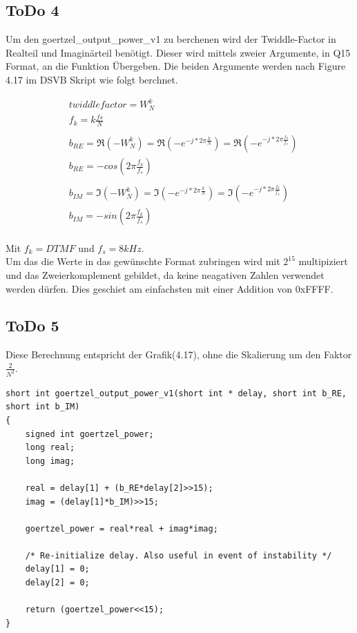 \documentclass[a4paper,11pt]{article}
\begin{document}
\subsection{ToDo 4}
Um den goertzel\_output\_power\_v1 zu berchenen wird der Twiddle-Factor in Realteil und Imaginärteil benötigt. Dieser wird mittels zweier Argumente, in Q15 Format, an die Funktion Übergeben. Die beiden Argumente werden nach Figure 4.17 im DSVB Skript wie folgt berchnet.

\begin{align*}
	&twiddlefactor = W^{k}_{N} \\
	&f_k = k\frac{fs}{N} \\\\
	&b_{RE} =\Re{(-W^{k}_{N})} = \Re{(-e^{-j*2\pi \frac{k}{N}})}=  \Re{(-e^{-j*2\pi \frac{f_k}{f_s}})}\\
	&b_{RE} = -cos(2\pi\frac{f_k}{f_s})\\\\
	&b_{IM} =\Im{(-W^{k}_{N})} = \Im{(-e^{-j*2\pi \frac{k}{N}})}=  \Im{(-e^{-j*2\pi \frac{f_k}{f_s}})}\\
	&b_{IM} = -sin(2\pi\frac{f_k}{f_s})
\end{align*}
\\
Mit $f_k = DTMF$ und $f_s = 8kHz$.
\\
Um das die Werte in das gewünschte Format zubringen wird mit $2^{15}$ multipiziert und das Zweierkomplement gebildet, da keine neagativen Zahlen verwendet werden dürfen. Dies geschiet am einfachsten mit einer Addition von 0xFFFF.

\subsection{ToDo 5}
Diese Berechnung entspricht der Grafik(4.17), ohne die Skalierung um den Faktor $\frac{2}{N^2}$.
\begin{lstlisting}
short int goertzel_output_power_v1(short int * delay, short int b_RE, short int b_IM)
{
	signed int goertzel_power;
	long real;
	long imag;

	real = delay[1] + (b_RE*delay[2]>>15);
	imag = (delay[1]*b_IM)>>15;

	goertzel_power = real*real + imag*imag;

    /* Re-initialize delay. Also useful in event of instability */
	delay[1] = 0;
	delay[2] = 0;

	return (goertzel_power<<15);
}
\end{lstlisting}
\end{document}
